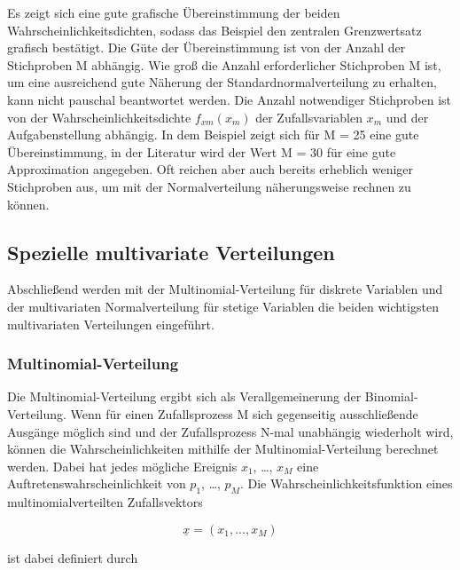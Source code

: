 \noindent Es zeigt sich eine gute grafische \"{U}bereinstimmung der beiden Wahrscheinlichkeitsdichten, sodass das Beispiel den zentralen Grenzwertsatz grafisch best\"{a}tigt. Die G\"{u}te der \"{U}bereinstimmung ist von der Anzahl der Stichproben M abh\"{a}ngig. Wie gro{\ss} die Anzahl erforderlicher Stichproben M ist, um eine ausreichend gute N\"{a}herung der Standardnormalverteilung zu erhalten, kann nicht pauschal beantwortet werden. Die Anzahl notwendiger Stichproben ist von der Wahrscheinlichkeitsdichte $f_{xm}(x_{m})$ der Zufallsvariablen $x_{m}$ und der Aufgabenstellung abh\"{a}ngig. In dem Beispiel zeigt sich f\"{u}r M = 25 eine gute \"{U}bereinstimmung, in der Literatur wird der Wert M = 30 f\"{u}r eine gute Approximation angegeben. Oft reichen aber auch bereits erheblich weniger Stichproben aus, um mit der Normalverteilung n\"{a}herungsweise rechnen zu k\"{o}nnen.

\clearpage

\subsection{Spezielle multivariate Verteilungen}

\noindent Abschlie{\ss}end werden mit der Multinomial-Verteilung f\"{u}r diskrete Variablen und der multivariaten Normalverteilung f\"{u}r stetige Variablen die beiden wichtigsten multivariaten Verteilungen eingef\"{u}hrt.

\subsubsection{Multinomial-Verteilung}

\noindent Die Multinomial-Verteilung ergibt sich als Verallgemeinerung der Binomial-Verteilung. Wenn f\"{u}r einen Zufallsprozess M sich gegenseitig ausschlie{\ss}ende Ausg\"{a}nge m\"{o}glich sind und der Zufallsprozess N-mal unabh\"{a}ngig wiederholt wird, k\"{o}nnen die Wahrscheinlichkeiten mithilfe der Multinomial-Verteilung berechnet werden. Dabei hat jedes m\"{o}gliche Ereignis $x_{1}$, {\dots}, $x_{M}$ eine Auftretenswahrscheinlichkeit von $p_{1}$, {\dots}, $p_{M}$. Die Wahrscheinlichkeitsfunktion eines multinomialverteilten Zufallsvektors

\begin{equation}\label{eq:eightsixtyeight}
\underline{x}=(x_{1} ,...,x_{M})
\end{equation}

\noindent ist dabei definiert durch

